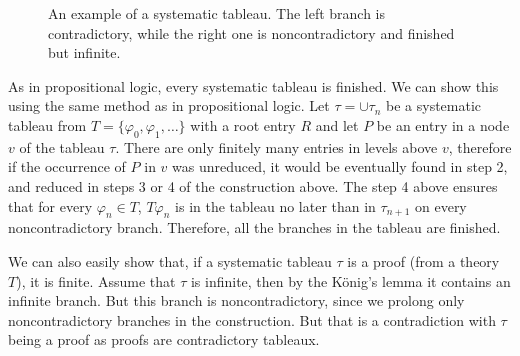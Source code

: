 \begin{figure}[t]
\centering
{}
\caption{An example of a systematic tableau. The left branch is contradictory, while the right one is noncontradictory and finished but infinite.}
\label{fig:tableau_systematic}
\end{figure}


As in propositional logic, every systematic tableau is finished. We can show this using the same method as in propositional logic. Let $\tau = \cup \tau_n$ be a systematic tableau from $T = \{\varphi_0, \varphi_1, \dots\}$ with a root entry $R$ and let $P$ be an entry in a node $v$ of the tableau $\tau$. There are only finitely many entries in levels above $v$, therefore if the occurrence of $P$ in $v$ was unreduced, it would be eventually found in step 2, and reduced in steps 3 or 4 of the construction above. The step 4 above ensures that for every $\varphi_n \in T$, $T \varphi_n$ is in the tableau no later than in $\tau_{n+1}$ on every noncontradictory branch. Therefore, all the branches in the tableau are finished.

We can also easily show that, if a systematic tableau $\tau$ is a proof (from a theory $T$), it is finite. Assume that $\tau$ is infinite, then by the König's lemma it contains an infinite branch. But this branch is noncontradictory, since we prolong only noncontradictory branches in the construction. But that is a contradiction with $\tau$ being a proof as proofs are contradictory tableaux.

